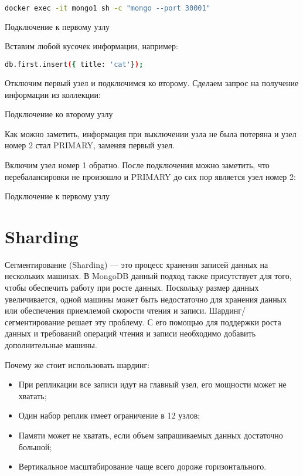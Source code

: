 \begin{lstlisting}[language=bash]
docker exec -it mongo1 sh -c "mongo --port 30001"
\end{lstlisting}

\begin{image}
	\caption{Подключение к первому узлу}
	\label{fig:connect:mongo1}
\end{image}

Вставим любой кусочек информации, например:

\begin{lstlisting}[language=bash]
db.first.insert({ title: 'cat'});
\end{lstlisting}

Отключим первый узел и подключимся ко второму.
Сделаем запрос на получение информации из коллекции:

\begin{image}
	\caption{Подключение ко второму узлу}
	\label{fig:connect:mongo2}
\end{image}

Как можно заметить, информация при выключении узла не была потеряна
и узел номер 2 стал PRIMARY, заменяя первый узел.

Включим узел номер 1 обратно.
После подключения можно заметить, что перебалансировки не
произошло и PRIMARY до сих пор является узел номер 2:

\begin{image}
	\caption{Подключение к первому узлу}
	\label{fig:connect:mongo1:2}
\end{image}

\section{Sharding}

Сегментирование (Sharding) --- это процесс хранения записей данных на
нескольких машинах. В MongoDB данный подход также присутствует для того,
чтобы обеспечить работу при росте данных. Поскольку размер данных
увеличивается, одной машины может быть недостаточно для хранения данных
или обеспечения приемлемой скорости чтения и
записи. Шардинг/сегментирование решает эту проблему. С его помощью для
поддержки роста данных и требований операций чтения и записи необходимо
добавить дополнительные машины.\par
Почему же стоит использовать шардинг:

\begin{itemize}
	\item При репликации все записи идут на главный узел, его мощности
	может не хватать;
	\item Один набор реплик имеет ограничение в 12 узлов;
	\item Памяти может не хватать, если объем запрашиваемых данных
	достаточно большой;
	\item Вертикальное масштабирование чаще всего дороже горизонтального.
\end{itemize}


